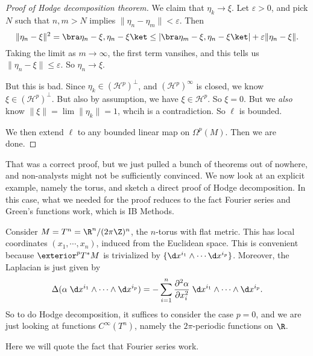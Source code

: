 \documentclass[a4paper]{article}
\begin{document}
\begin{proof}[Proof of Hodge decomposition theorem]
  We claim that $\eta_k \to \xi$. Let $\varepsilon > 0$, and pick $N$ such that $n, m > N$ implies $\|\eta_n - \eta_m\| < \varepsilon$. Then
  \[
    \|\eta_n - \xi\|^2 = \bra \eta_n - \xi, \eta_n - \xi\ket \leq |\bra \eta_m - \xi, \eta_n - \xi\ket| + \varepsilon\|\eta_n - \xi\|.
  \]
  Taking the limit as $m \to \infty$, the first term vansihes, and this tells us $\|\eta_n - \xi\| \leq \varepsilon$. So $\eta_n \to \xi$.

  But this is bad. Since $\eta_k \in (\mathcal{H}^p)^\perp$, and $(\mathcal{H}^p)^\infty$ is closed, we know $\xi \in (\mathcal{H}^p)^\perp$. But also by assumption, we have $\xi \in \mathcal{H}^p$. So $\xi = 0$. But we \emph{also} know $\|\xi\| = \lim \|\eta_k\| = 1$, whcih is a contradiction. So $\ell$ is bounded.

  We then extend $\ell$ to any bounded linear map on $\Omega^p(M)$. Then we are done.
\end{proof}

That was a correct proof, but we just pulled a bunch of theorems out of nowhere, and non-analysts might not be sufficiently convinced. We now look at an explicit example, namely the torus, and sketch a direct proof of Hodge decomposition. In this case, what we needed for the proof reduces to the fact Fourier series and Green's functions work, which is IB Methods.

Consider $M = T^n = \R^n/(2\pi \Z)^n$, the $n$-torus with flat metric. This has local coordinates $(x_1, \cdots, x_n)$, induced from the Euclidean space. This is convenient because $\exterior^p T^*M$ is trivialized by $\{\d x^{i_1} \wedge \cdots \d x^{i_p}\}$. Moreover, the Laplacian is just given by
\[
  \Delta (\alpha \; \d x^{i_1} \wedge \cdots \wedge \d x^{i_p}) = -\sum_{i = 1}^n \frac{\partial^2 \alpha}{\partial x_i^2}\;\d x^{i_1} \wedge \cdots \wedge \d x^{i_p}.
\]
So to do Hodge decomposition, it suffices to consider the case $p = 0$, and we are just looking at functions $C^\infty(T^n)$, namely the $2\pi$-periodic functions on $\R$.

Here we will quote the fact that Fourier series work.
\end{document}
